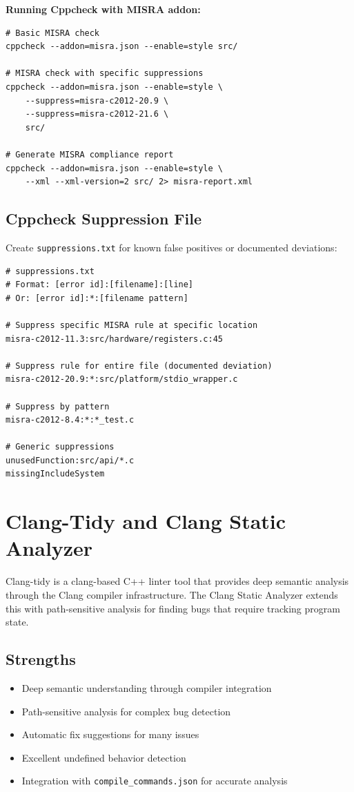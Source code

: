 \documentclass[11pt,letterpaper]{report}
\begin{document}
\textbf{Running Cppcheck with MISRA addon:}

\begin{lstlisting}[style=bashstyle]
# Basic MISRA check
cppcheck --addon=misra.json --enable=style src/

# MISRA check with specific suppressions
cppcheck --addon=misra.json --enable=style \
    --suppress=misra-c2012-20.9 \
    --suppress=misra-c2012-21.6 \
    src/

# Generate MISRA compliance report
cppcheck --addon=misra.json --enable=style \
    --xml --xml-version=2 src/ 2> misra-report.xml
\end{lstlisting}

\subsection{Cppcheck Suppression File}

Create \texttt{suppressions.txt} for known false positives or documented deviations:

\begin{lstlisting}[style=codestyle]
# suppressions.txt
# Format: [error id]:[filename]:[line]
# Or: [error id]:*:[filename pattern]

# Suppress specific MISRA rule at specific location
misra-c2012-11.3:src/hardware/registers.c:45

# Suppress rule for entire file (documented deviation)
misra-c2012-20.9:*:src/platform/stdio_wrapper.c

# Suppress by pattern
misra-c2012-8.4:*:*_test.c

# Generic suppressions
unusedFunction:src/api/*.c
missingIncludeSystem
\end{lstlisting}

\section{Clang-Tidy and Clang Static Analyzer}

Clang-tidy is a clang-based C++ linter tool that provides deep semantic analysis through the Clang compiler infrastructure. The Clang Static Analyzer extends this with path-sensitive analysis for finding bugs that require tracking program state.

\subsection{Strengths}

\begin{itemize}[leftmargin=*]
    \item Deep semantic understanding through compiler integration
    \item Path-sensitive analysis for complex bug detection
    \item Automatic fix suggestions for many issues
    \item Excellent undefined behavior detection
    \item Integration with \texttt{compile\_commands.json} for accurate analysis
\end{itemize}
\end{document}
